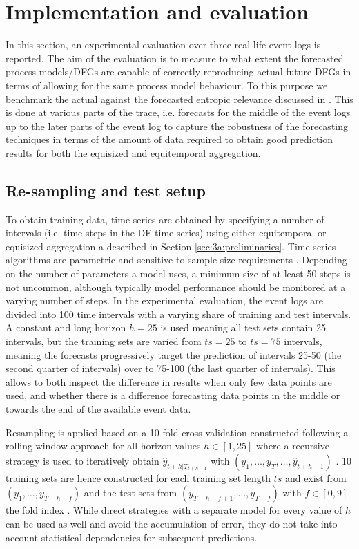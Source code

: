 \section{Implementation and evaluation}\label{sec:experiment}
In this section, an experimental evaluation over three real-life event logs is reported.
The aim of the evaluation is to measure to what extent the forecasted process models/DFGs are capable of correctly reproducing actual future DFGs in terms of allowing for the same process model behaviour.
To this purpose we benchmark the actual against the forecasted entropic relevance discussed in .
This is done at various parts of the trace, i.e. forecasts for the middle of the event logs up to the later parts of the event log to capture the robustness of the forecasting techniques in terms of the amount of data required to obtain good prediction results for both the equisized and equitemporal aggregation.

\subsection{Re-sampling and test setup}
To obtain training data, time series are obtained by specifying a number of intervals (i.e. time steps in the DF time series) using either equitemporal or equisized aggregation a described in Section \ref{sec:3a:preliminaries}.
Time series algorithms are parametric and sensitive to sample size requirements \cite{hanke2001business}.
Depending on the number of parameters a model uses, a minimum size of at least 50 steps is not uncommon, although typically model performance should be monitored at a varying number of steps.
In the experimental evaluation, the event logs are divided into 100 time intervals with a varying share of training and test intervals. A constant and long horizon $h=25$ is used meaning all test sets contain 25 intervals, but the training sets are varied from $ts=25$ to $ts=75$ intervals, meaning the forecasts progressively target the prediction of intervals 25-50 (the second quarter of intervals) over to 75-100 (the last quarter of intervals).
This allows to both inspect the difference in results when only few data points are used, and whether there is a difference forecasting data points in the middle or towards the end of the available event data.

Resampling is applied based on a 10-fold cross-validation constructed following a rolling window approach for all horizon values $h\in[1,25]$ where a recursive strategy is used to iteratively obtain $\hat{y}_{t+h|T_{t+h-1}}$ with $(y_1,\dots,y_{T},\dots,\hat{y}_{t+h-1})$ \cite{weigend2018time}.
10 training sets are hence constructed for each training set length $ts$ and exist from $(y_1,\dots,y_{T-h-f})$ and the test sets from $(y_{T-h-f+1},\dots,y_{T-f})$ with $f\in[0,9]$ the fold index \cite{bergmeir2012use}.
While direct strategies with a separate model for every value of $h$ can be used as well and avoid the accumulation of error, they do not take into account statistical dependencies for subsequent predictions.


